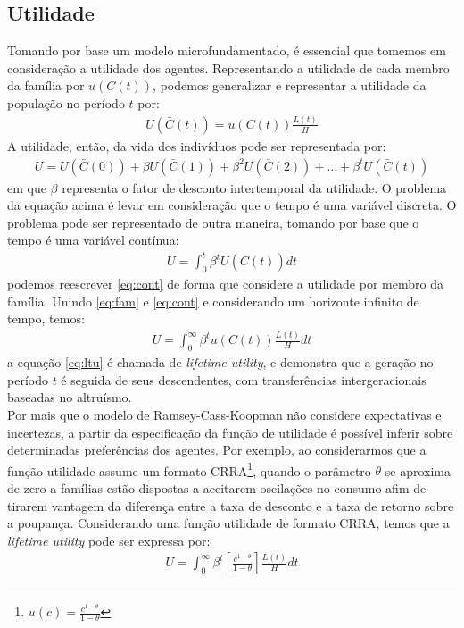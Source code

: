 \documentclass[11pt,a4paper]{article}
\begin{document}
\subsection{Utilidade}
Tomando por base um modelo microfundamentado, é essencial que tomemos em consideração a utilidade dos agentes. Representando a utilidade de cada membro da família por $u(C(t))$, podemos generalizar e representar a utilidade da população no período $t$ por:
\begin{align*}
U(\bar{C}(t)) = u(C(t))\frac{L(t)}{H}
\end{align*} 
\noindent
A utilidade, então, da vida dos indivíduos pode ser representada por:
\begin{align}
U = U(\bar{C}(0)) + \beta U(\bar{C}(1)) + \beta^2 U(\bar{C}(2)) + \dots + \beta^t U(\bar{C}(t)) 
\end{align}
\noindent
em que $\beta$ representa o fator de desconto intertemporal da utilidade. O problema da equação acima é levar em consideração que o tempo é uma variável discreta. O problema pode ser representado de outra maneira, tomando por base que o tempo é uma variável contínua:
\begin{align} \label{eq:cont}
U = \int_0 ^t \beta^t U(\bar{C}(t))dt
\end{align}
\noindent
podemos reescrever \eqref{eq:cont} de forma que considere a utilidade por membro da família. Unindo \eqref{eq:fam} e \eqref{eq:cont} e considerando um horizonte infinito de tempo, temos:
\begin{align} \label{eq:ltu}
U = \int_0 ^\infty \beta^t u(C(t))\frac{L(t)}{H} dt
\end{align}
\noindent
a equação \eqref{eq:ltu} é chamada de \textit{lifetime utility}, e demonstra que a geração no período $t$ é seguida de seus descendentes, com transferências intergeracionais baseadas no altruísmo.\\

Por mais que o modelo de Ramsey-Cass-Koopman não considere expectativas e incertezas, a partir da especificação da função de utilidade é possível inferir sobre determinadas preferências dos agentes. Por exemplo, ao considerarmos que a função utilidade assume um formato CRRA\footnote{$u(c) = \frac{c^{1-\theta}}{1-\theta}$}, quando o parâmetro $\theta$ se aproxima de zero a famílias estão dispostas a aceitarem oscilações no consumo afim de tirarem vantagem da diferença entre a taxa de desconto e a taxa de retorno sobre a poupança. Considerando uma função utilidade de formato CRRA, temos que a \textit{lifetime utility} pode ser expressa por:
\begin{align*} 
U = \int_0 ^\infty \beta^t \left[\frac{c^{1-\theta}}{1-\theta}\right]\frac{L(t)}{H} dt
\end{align*}
\end{document}
